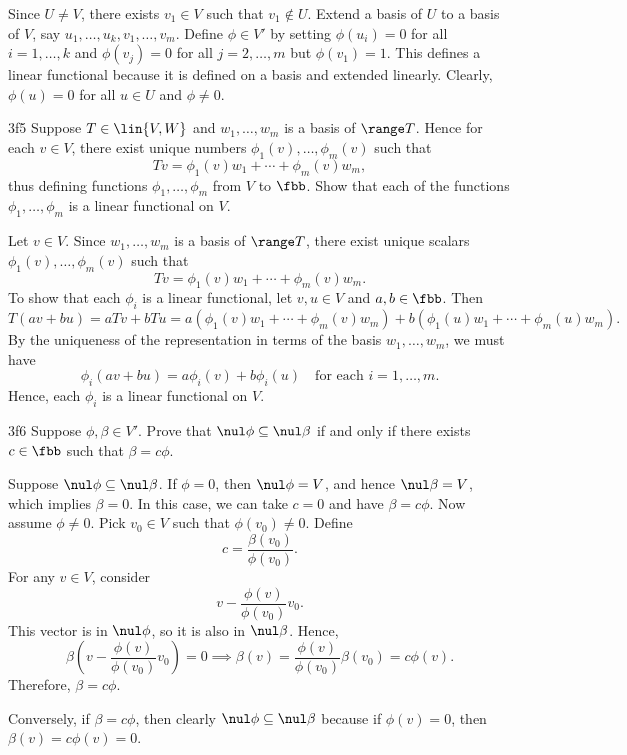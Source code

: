 \begin{sol}
    Since $U \neq V$, there exists $v_1 \in V$ such that $v_1 \notin U$.
	Extend a basis of $U$ to a basis of $V$, say $u_1, \ldots, u_k, v_1, \ldots, v_m$.
	Define $\phi \in V'$ by setting $\phi(u_i) = 0$ for all $i = 1, \ldots, k$ and $\phi(v_j) = 0$ for all $j = 2, \ldots, m$ but $\phi(v_1) = 1$.
	This defines a linear functional because it is defined on a basis and extended linearly.
	Clearly, $\phi(u) = 0$ for all $u \in U$ and $\phi \neq 0$.
\end{sol}

\begin{exercise}{3f5}
    Suppose $T \in \lin{V, W}$ and $w_1, \ldots, w_m$ is a basis of $\range T$.
	Hence for each $v \in V$, there exist unique numbers $\phi_1(v), \ldots, \phi_m(v)$ such that
    \[
    	Tv = \phi_1(v) w_1 + \cdots + \phi_m(v) w_m,
    \]
    thus defining functions $\phi_1, \ldots, \phi_m$ from $V$ to $\fbb$.
	Show that each of the functions $\phi_1, \ldots, \phi_m$ is a linear functional on $V$.
\end{exercise}

\begin{sol}
    Let $v \in V$.
	Since $w_1, \ldots, w_m$ is a basis of $\range T$, there exist unique scalars $\phi_1(v), \ldots, \phi_m(v)$ such that
    \[
    	Tv = \phi_1(v) w_1 + \cdots + \phi_m(v) w_m.
    \]
    To show that each $\phi_i$ is a linear functional, let $v, u \in V$ and $a, b \in \fbb$.
	Then
    \[
    	T(av + bu) = aTv + bTu = a(\phi_1(v) w_1 + \cdots + \phi_m(v) w_m) + b(\phi_1(u) w_1 + \cdots + \phi_m(u) w_m).
    \]
    By the uniqueness of the representation in terms of the basis $w_1, \ldots, w_m$, we must have
    \[
    	\phi_i(av + bu) = a\phi_i(v) + b\phi_i(u) \quad \text{for each } i = 1, \ldots, m.
    \]
    Hence, each $\phi_i$ is a linear functional on $V$.
\end{sol}

\begin{exercise}{3f6}
    Suppose $\phi, \beta \in V'$.
	Prove that $\nul \phi \subseteq \nul \beta$ if and only if there exists $c \in \fbb$ such that $\beta = c\phi$.
\end{exercise}

\begin{sol}
    Suppose $\nul \phi \subseteq \nul \beta$.
	If $\phi = 0$, then $\nul \phi = V$, and hence $\nul \beta = V$, which implies $\beta = 0$.
	In this case, we can take $c = 0$ and have $\beta = c\phi$.
	Now assume $\phi \neq 0$.
	Pick $v_0 \in V$ such that $\phi(v_0) \neq 0$.
	Define
    \[
    	c = \frac{\beta(v_0)}{\phi(v_0)}.
    \] 
    For any $v \in V$, consider
    \[
    	v - \frac{\phi(v)}{\phi(v_0)} v_0.
    \]
    This vector is in $\nul \phi$, so it is also in $\nul \beta$.
	Hence,
    \[
    	\beta\left(v - \frac{\phi(v)}{\phi(v_0)} v_0\right) = 0 \implies \beta(v) = \frac{\phi(v)}{\phi(v_0)} \beta(v_0) = c \phi(v).
    \]
    Therefore, $\beta = c\phi$.
    
    Conversely, if $\beta = c\phi$, then clearly $\nul \phi \subseteq \nul \beta$ because if $\phi(v) = 0$, then $\beta(v) = c\phi(v) = 0$.
\end{sol}


